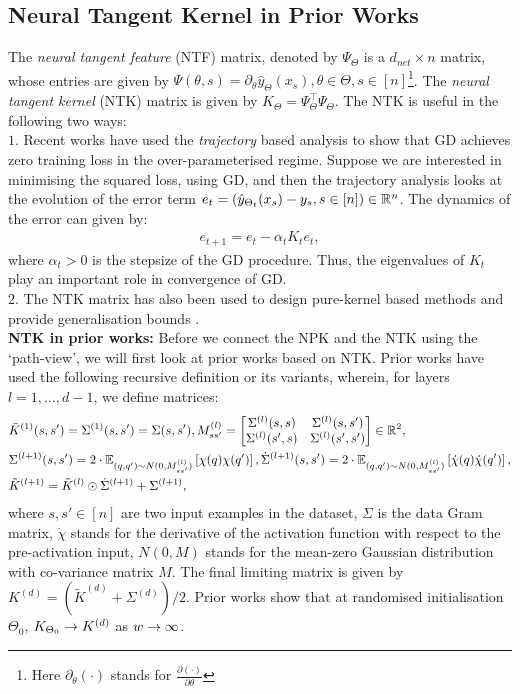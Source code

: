 \subsection{Neural Tangent Kernel in Prior Works}
The \emph{neural tangent feature} (NTF) matrix, denoted by $\Psi_{\Theta}$ is a $d_{net}\times n$ matrix, whose entries are given by $\Psi(\theta,s)=\partial_{\theta} \hat{y}_{\Theta}(x_s),\theta\in\Theta, s\in[n]$\footnote{Here $\partial_{\theta}(\cdot)$ stands for $\frac{\partial (\cdot)}{\partial \theta}$}. The \emph{neural tangent kernel} (NTK) matrix is given by $K_{\Theta}=\Psi_{\Theta}^\top\Psi_{\Theta}$. The NTK is useful in the following two ways:\\
$1.$ Recent works have used the \emph{trajectory} based analysis to show that GD achieves zero training loss in the over-parameterised regime. Suppose we are interested in minimising the squared loss, using GD, and then the trajectory analysis looks at the evolution of the error term $e_t=(\hat{y}_{\Theta_t}(x_s)-y_s,s\in[n])\in\mathbb{R}^n$. The dynamics of the error can given by:
\begin{align}
e_{t+1}=e_t-\alpha_t K_t e_t,
\end{align}
where $\alpha_t>0$ is the stepsize of the GD procedure. Thus, the eigenvalues of $K_t$ play an important role in convergence of GD.\\
$2.$ The NTK matrix has also been used to design pure-kernel based methods \cite{arora2019exact} and provide generalisation bounds \cite{cao2019generalization}.\\
\textbf{NTK in prior works:} Before we connect the NPK and the NTK using the `path-view', we will first look at prior works based on NTK. Prior works have used the following recursive definition or its variants, wherein, for layers $l=1,\ldots, d-1$, we define matrices:
\begin{align}\label{eq:ntkold}
&\tilde{K}^{(1)}(s,s')=\Sigma^{(1)}(s,s')=\Sigma(s,s'), M^{(l)}_{ss'}=\left[\begin{matrix}\Sigma^{(l)}(s,s) & \Sigma^{(l)}(s,s')\\ \Sigma^{(l)}(s',s) & \Sigma^{(l)}(s',s')\end{matrix}\right]\in \mathbb{R}^2,\\
&\Sigma^{(l+1)}(s,s')= 2\cdot\mathbb{E}_{(q,q')\sim N(0,M_{ss'}^{(l)})} \left[\chi(q)\chi(q')\right], \dot{\Sigma}^{(l+1)}(s,s')= 2\cdot\mathbb{E}_{(q,q')\sim N(0,M_{ss'}^{(l)})}\left[\dot{\chi}(q)\dot{\chi}(q')\right],\nonumber\\
&\tilde{K}^{(l+1)}=\tilde{K}^{(l)}\odot \dot{\Sigma}^{(l+1)}+\Sigma^{(l+1)},\nonumber
\end{align}
where $s,s'\in[n]$ are two input examples in the dataset, $\Sigma$ is the data Gram matrix, $\dot{\chi}$ stands for the derivative of the activation function with respect to the pre-activation input, $N(0,M)$ stands for the mean-zero Gaussian distribution with co-variance matrix $M$. The final limiting matrix is given by $K^{(d)}=\left(\tilde{K}^{(d)}+\Sigma^{(d)}\right)/2$. Prior works show that at randomised initialisation $\Theta_0$, $K_{\Theta_0}\rightarrow K^{(d)}$ as $w\rightarrow \infty$.
